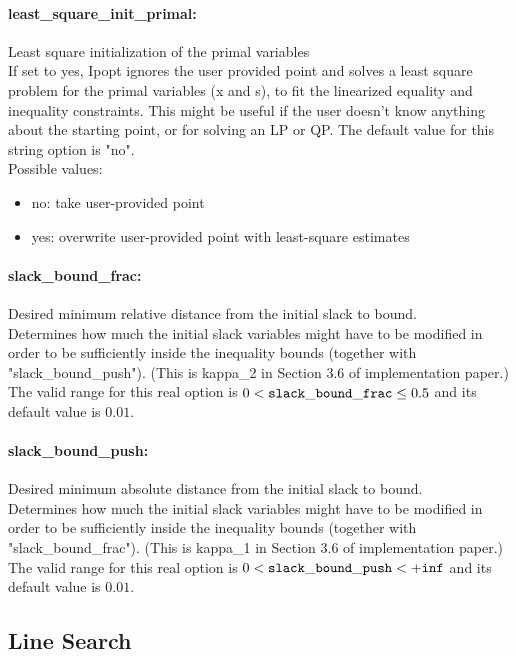 \paragraph{least\_square\_init\_primal:}\label{opt:least_square_init_primal} Least square initialization of the primal variables \\
 If set to yes, Ipopt ignores the user provided point and solves a least square problem for the primal variables (x and s), to fit the linearized equality and inequality constraints.  This might be useful if the user doesn't know anything about the starting point, or for solving an LP or QP. The default value for this string option is "no".
\\ 
Possible values:
\begin{itemize}
   \item no: take user-provided point
   \item yes: overwrite user-provided point with least-square estimates
\end{itemize}

\paragraph{slack\_bound\_frac:}\label{opt:slack_bound_frac} Desired minimum relative distance from the initial slack to bound. \\
 Determines how much the initial slack variables might have to be modified in order to be sufficiently inside the inequality bounds (together with "slack\_bound\_push").  (This is kappa\_2 in Section 3.6 of implementation paper.) The valid range for this real option is 
$0 <  {\tt slack\_bound\_frac } \le 0.5$
and its default value is $0.01$.


\paragraph{slack\_bound\_push:}\label{opt:slack_bound_push} Desired minimum absolute distance from the initial slack to bound. \\
 Determines how much the initial slack variables might have to be modified in order to be sufficiently inside the inequality bounds (together with "slack\_bound\_frac").  (This is kappa\_1 in Section 3.6 of implementation paper.) The valid range for this real option is 
$0 <  {\tt slack\_bound\_push } <  {\tt +inf}$
and its default value is $0.01$.


\subsection{Line Search}
\label{sec:LineSearch}
